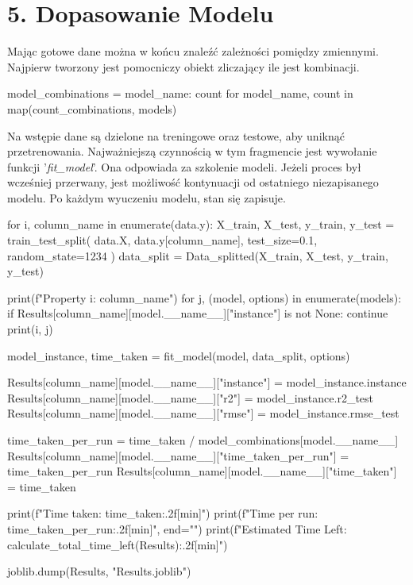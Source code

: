 {}
\justify
\fontsize{14}{16}\selectfont
\setlength{\parindent}{0pt}
\section*{5. Dopasowanie Modelu} 
\fontsize{12}{14}\selectfont

\hspace{1.5cm} Mając gotowe dane można w końcu znaleźć zależności pomiędzy zmiennymi. 
Najpierw tworzony jest pomocniczy obiekt zliczający ile jest kombinacji.
\begin{pythoncode}
model_combinations = {
    model_name: count for model_name, count in map(count_combinations, models)
}
\end{pythoncode}

\hspace{1.5cm} Na wstępie dane są dzielone na treningowe oraz testowe, aby uniknąć przetrenowania.
Najważniejszą czynnością w tym fragmencie jest wywołanie funkcji '\textit{fit\_model}'. 
Ona odpowiada za szkolenie modeli. 
Jeżeli proces był wcześniej przerwany, jest możliwość kontynuacji od ostatniego niezapisanego modelu. Po każdym wyuczeniu modelu, stan się zapisuje. 

\begin{pythoncode}
for i, column_name in enumerate(data.y):
    X_train, X_test, y_train, y_test = train_test_split(
        data.X, data.y[column_name], test_size=0.1, random_state=1234
    )
    data_split = Data_splitted(X_train, X_test, y_train, y_test)

    print(f"Property {i}: {column_name}")
    for j, (model, options) in enumerate(models):
        if Results[column_name][model.__name__]["instance"] is not None:
            continue
        print(i, j)

        model_instance, time_taken = fit_model(model, data_split, options)

        Results[column_name][model.__name__]["instance"] = model_instance.instance
        Results[column_name][model.__name__]["r2"] = model_instance.r2_test
        Results[column_name][model.__name__]["rmse"] = model_instance.rmse_test

        time_taken_per_run = time_taken / model_combinations[model.__name__]
        Results[column_name][model.__name__]["time_taken_per_run"] = time_taken_per_run
        Results[column_name][model.__name__]["time_taken"] = time_taken

        print(f"Time taken: {time_taken:.2f}[min]")
        print(f"Time per run: {time_taken_per_run:.2f}[min]", end="\n\n")
        print(f"Estimated Time Left: {calculate_total_time_left(Results):.2f}[min]")

        joblib.dump(Results, "Results.joblib")
\end{pythoncode}

